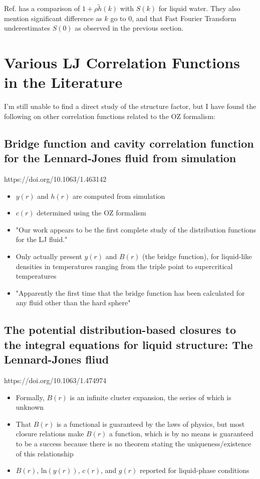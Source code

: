 \documentclass[journal=jacsat,manuscript=article]{achemso}
\begin{document}
	Ref.  has a comparison of $1+\rho \tilde{h}(k)$ with $S(k)$ for liquid water. They also mention significant difference as $k$ go to 0, and that Fast Fourier Transform underestimates $S(0)$ as observed in the previous section.
	

\section{Various LJ Correlation Functions in the Literature}
I'm still unable to find a direct study of the structure factor, but I have found the following on other correlation functions related to the OZ formalism:

\subsection{Bridge function and cavity correlation function for the Lennard-Jones fluid from simulation}
https://doi.org/10.1063/1.463142
\begin{itemize}
    \item $y(r)$ and $h(r)$ are computed from simulation
    \item $c(r)$ determined using the OZ formalism
    \item "Our work appears to be the first complete study of the distribution functions for the LJ fluid."
    \item Only actually present $y(r)$ and $B(r)$ (the bridge function), for liquid-like densities in temperatures ranging from the triple point to supercritical temperatures
    \item "Apparently the first time that the bridge function has been calculated for any fluid other than the hard sphere"
\end{itemize}

\subsection{The potential distribution-based closures to the integral equations for liquid structure: The Lennard-Jones fliud}
https://doi.org/10.1063/1.474974
\begin{itemize}
    \item Formally, $B(r)$ is an infinite cluster expansion, the series of which is unknown
    \item That $B(r)$ is a functional is guaranteed by the laws of physics, but most closure relations make $B(r)$ a function, which is by no means is guaranteed to be a success because there is no theorem stating the uniqueness/existence of this relationship
    \item $B(r)$, $\textrm{ln}(y(r))$, $c(r)$, and $g(r)$ reported for liquid-phase conditions 
\end{itemize}
\end{document}
